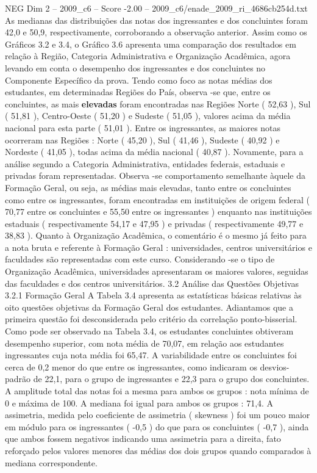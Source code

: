\begin{textsample}{NEG Dim 2 – 2009\_c6 – Score -2.00 – 2009\_c6/enade\_2009\_ri\_4686cb254d.txt}
As medianas das distribuições das notas dos ingressantes e dos concluintes foram 42,0 e 50,9, respectivamente, corroborando a observação anterior.
Assim como os Gráficos 3.2 e 3.4, o Gráfico 3.6 apresenta uma comparação dos resultados em relação à Região, Categoria Administrativa e Organização Acadêmica, agora levando em conta o desempenho dos ingressantes e dos concluintes no Componente Específico da prova.
Tendo como foco as notas médias dos estudantes, em determinadas Regiões do País, observa -se que, entre os concluintes, as mais \textbf{elevadas} foram encontradas nas Regiões Norte ( 52,63 ), Sul ( 51,81 ), Centro-Oeste ( 51,20 ) e Sudeste ( 51,05 ), valores acima da média nacional para esta parte ( 51,01 ).
Entre os ingressantes, as maiores notas ocorreram nas Regiões : Norte ( 45,20 ), Sul ( 41,46 ), Sudeste ( 40,92 ) e Nordeste ( 41,05 ), todas acima da média nacional ( 40,87 ).
Novamente, para a análise segundo a Categoria Administrativa, entidades federais, estaduais e privadas foram representadas.
Observa -se comportamento semelhante àquele da Formação Geral, ou seja, as médias mais elevadas, tanto entre os concluintes como entre os ingressantes, foram encontradas em instituições de origem federal ( 70,77 entre os concluintes e 55,50 entre os ingressantes ) enquanto nas instituições estaduais ( respectivamente 54,17 e 47,95 ) e privadas ( respectivamente 49,77 e 38,83 ).
Quanto à Organização Acadêmica, o comentário é o mesmo já feito para a nota bruta e referente à Formação Geral : universidades, centros universitários e faculdades são representadas com este curso.
Considerando -se o tipo de Organização Acadêmica, universidades apresentaram os maiores valores, seguidas das faculdades e dos centros universitários. 3.2 Análise das Questões Objetivas 3.2.1 Formação Geral A Tabela 3.4 apresenta as estatísticas básicas relativas às oito questões objetivas da Formação Geral dos estudantes.
Adiantamos que a primeira questão foi desconsiderada pelo critério da correlação ponto-bisserial.
Como pode ser observado na Tabela 3.4, os estudantes concluintes obtiveram desempenho superior, com nota média de 70,07, em relação aos estudantes ingressantes cuja nota média foi 65,47.
A variabilidade entre os concluintes foi cerca de 0,2 menor do que entre os ingressantes, como indicaram os desvios-padrão de 22,1, para o grupo de ingressantes e 22,3 para o grupo dos concluintes.
A amplitude total das notas foi a mesma para ambos os grupos : nota mínima de 0 e máxima de 100.
A mediana foi igual para ambos os grupos : 71,4.
A assimetria, medida pelo coeficiente de assimetria ( skewness ) foi um pouco maior em módulo para os ingressantes ( -0,5 ) do que para os concluintes ( -0,7 ), ainda que ambos fossem negativos indicando uma assimetria para a direita, fato reforçado pelos valores menores das médias dos dois grupos quando comparados à mediana correspondente.

\end{textsample}
